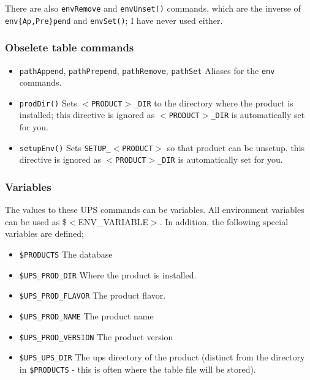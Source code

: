 \documentclass{article}
\begin{document}
There are also \texttt{envRemove} and \texttt{envUnset()} commands, which
are the inverse of \texttt{env\{Ap,Pre\}pend} and \texttt{envSet()}; I have
never used either.     

\subsubsection{Obselete table commands}

\begin{itemize}
   \item \texttt{pathAppend}, \texttt{pathPrepend}, \texttt{pathRemove}, \texttt{pathSet}
     Aliases for the \texttt{env} commands.
     
   \item \texttt{prodDir()}
     Sets \texttt{$<$PRODUCT$>$\_DIR} to the directory where the product is installed;
     this directive is ignored as \texttt{$<$PRODUCT$>$\_DIR} is automatically set for you.
     
   \item \texttt{setupEnv()}
     Sets \texttt{SETUP\_$<$PRODUCT$>$} so that product can be unsetup.
     this directive is ignored as \texttt{$<$PRODUCT$>$\_DIR} is automatically set for you.
\end{itemize}
        
\subsubsection{Variables}

The values to these UPS commands can be variables. All environment
variables can be used as \${$<$ENV\_VARIABLE$>$}. In addition, the following special
variables are defined;

\begin{itemize}
  \item \texttt{\${PRODUCTS}}
    The database
    
  \item \texttt{\${UPS\_PROD\_DIR}}
    Where the product is installed.
    
  \item \texttt{\${UPS\_PROD\_FLAVOR}}
    The product flavor.
    
  \item \texttt{\${UPS\_PROD\_NAME}}
    The product name
    
  \item \texttt{\${UPS\_PROD\_VERSION}}
    The product version
    
  \item \texttt{\${UPS\_UPS\_DIR}}
    The ups directory of the product (distinct from the directory
    in \texttt{\$PRODUCTS} - this is often where the table file will be stored).
\end{itemize}
\end{document}
